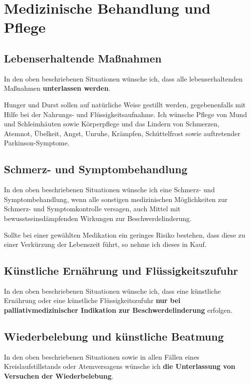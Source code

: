 \documentclass[pdftex,12pt,a4paper]{article}
\begin{document}
\section{Medizinische Behandlung und Pflege}



\subsection{Lebenserhaltende Maßnahmen}

In den oben beschriebenen Situationen wünsche ich,
dass alle lebenserhaltenden Maßnahmen \textbf{unterlassen werden}. 

Hunger und Durst sollen auf natürliche Weise gestillt werden, gegebenenfalls mit Hilfe bei der Nahrungs- und Flüssigkeitsaufnahme. Ich wünsche Pflege von Mund und Schleimhäuten sowie Körperpflege und das Lindern von Schmerzen, Atemnot, Übelkeit, Angst, Unruhe, Krämpfen, Schüttelfrost sowie 
auftretender Parkinson-Symptome.

\subsection{Schmerz- und Symptombehandlung}

In den oben beschriebenen Situationen wünsche ich eine 
Schmerz- und Symptombehandlung,
wenn alle sonstigen medizinischen Möglichkeiten zur Schmerz- und Symptomkontrolle versagen, auch Mittel mit bewusstseinsdämpfenden Wirkungen zur Beschwerdelinderung.

Sollte bei einer gewählten Medikation ein geringes Risiko 
bestehen, dass diese zu einer Verkürzung der Lebenszeit führt, so
nehme ich dieses in Kauf.



\subsection{Künstliche Ernährung und Flüssigkeitszufuhr}

In den oben beschriebenen Situationen wünsche ich,
dass eine künstliche Ernährung oder eine künstliche Flüssigkeitszufuhr
\textbf{nur bei palliativmedizinischer Indikation zur Beschwerdelinderung} erfolgen.


\subsection{Wiederbelebung und künstliche Beatmung}

In den oben beschriebenen Situationen sowie in allen Fällen eines
Kreislaufstillstands oder Atemversagens wünsche ich
\textbf{die Unterlassung von Versuchen der Wiederbelebung}.
\end{document}
